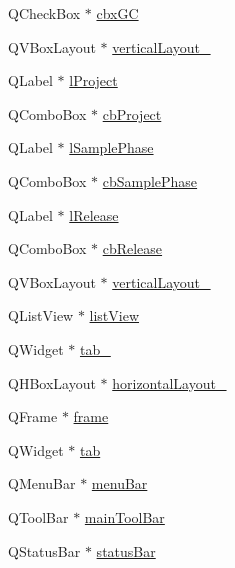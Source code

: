 \begin{DoxyCompactItemize}
\item 
Q\+Check\+Box $\ast$ \hyperlink{class_ui___remote_hidden_helper_class_a51b54c903e7919f1b6518d013116e58e}{cbx\+GC}
\item 
Q\+V\+Box\+Layout $\ast$ \hyperlink{class_ui___remote_hidden_helper_class_a1060db6b11dc90b7cd55a0171d4a1f9d}{vertical\+Layout\+\_}
\item 
Q\+Label $\ast$ \hyperlink{class_ui___remote_hidden_helper_class_addc6406f18551bec62d57733aaee4a0e}{l\+Project}
\item 
Q\+Combo\+Box $\ast$ \hyperlink{class_ui___remote_hidden_helper_class_a7caecd9759e6ff52726b548279021140}{cb\+Project}
\item 
Q\+Label $\ast$ \hyperlink{class_ui___remote_hidden_helper_class_add28abff8a8f0534cdfffeb33ba4faaf}{l\+Sample\+Phase}
\item 
Q\+Combo\+Box $\ast$ \hyperlink{class_ui___remote_hidden_helper_class_ae3964614499043876a7a8bc28130fb94}{cb\+Sample\+Phase}
\item 
Q\+Label $\ast$ \hyperlink{class_ui___remote_hidden_helper_class_a2105c5fa8a1d1b475d7773791b32d856}{l\+Release}
\item 
Q\+Combo\+Box $\ast$ \hyperlink{class_ui___remote_hidden_helper_class_aa7a97b774b94a003204ab5e01dc435ae}{cb\+Release}
\item 
Q\+V\+Box\+Layout $\ast$ \hyperlink{class_ui___remote_hidden_helper_class_ad22dc7780120a5ada99015716388a2b8}{vertical\+Layout\+\_}
\item 
Q\+List\+View $\ast$ \hyperlink{class_ui___remote_hidden_helper_class_a7c39b8238e6c9fc7943d801213bd76e8}{list\+View}
\item 
Q\+Widget $\ast$ \hyperlink{class_ui___remote_hidden_helper_class_ac10b9b3c90ebc8ee171f32ac9b9af200}{tab\+\_}
\item 
Q\+H\+Box\+Layout $\ast$ \hyperlink{class_ui___remote_hidden_helper_class_a2f6542559743da2dda19c64adc2c9293}{horizontal\+Layout\+\_}
\item 
Q\+Frame $\ast$ \hyperlink{class_ui___remote_hidden_helper_class_aff7dcaaffceec85210d256c0e1bd0e2a}{frame}
\item 
Q\+Widget $\ast$ \hyperlink{class_ui___remote_hidden_helper_class_ae37c455b5bea2ecfd49d5f4bcc42f817}{tab}
\item 
Q\+Menu\+Bar $\ast$ \hyperlink{class_ui___remote_hidden_helper_class_a5070c6224e8c4c0de41bcf625ac9abf0}{menu\+Bar}
\item 
Q\+Tool\+Bar $\ast$ \hyperlink{class_ui___remote_hidden_helper_class_a2e835959e777a658b3b38ae3848b37de}{main\+Tool\+Bar}
\item 
Q\+Status\+Bar $\ast$ \hyperlink{class_ui___remote_hidden_helper_class_aec299b00778de7ae92f885205fbd2820}{status\+Bar}
\end{DoxyCompactItemize}


